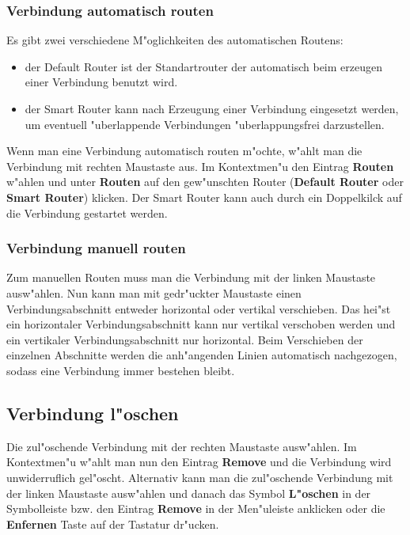 \documentclass[a4paper,titlepage,12pt,ngerman]{scrbook}
\begin{document}
\subsubsection{Verbindung automatisch routen}
Es gibt zwei verschiedene M"oglichkeiten des automatischen Routens:
\begin{itemize}
\item der Default Router ist der Standartrouter der automatisch beim erzeugen einer Verbindung benutzt wird.
\item der Smart Router kann nach Erzeugung einer Verbindung eingesetzt werden, um eventuell "uberlappende Verbindungen "uberlappungsfrei darzustellen.
\end{itemize}
Wenn man eine Verbindung automatisch routen m"ochte, w"ahlt man die Verbindung mit rechten Maustaste aus. Im Kontextmen"u den Eintrag {\bf Routen} w"ahlen und unter {\bf Routen} auf den gew"unschten Router ({\bf Default Router} oder {\bf Smart Router}) klicken.\newline
Der Smart Router kann auch durch ein Doppelkilck auf die Verbindung gestartet werden.

\subsubsection{Verbindung manuell routen}
Zum manuellen Routen muss man die Verbindung mit der linken Maustaste ausw"ahlen. Nun kann man mit gedr"uckter Maustaste einen Verbindungsabschnitt entweder horizontal oder vertikal verschieben. Das hei"st ein horizontaler Verbindungsabschnitt kann nur vertikal verschoben werden und ein vertikaler Verbindungsabschnitt nur horizontal. Beim Verschieben der einzelnen Abschnitte werden die anh"angenden Linien automatisch nachgezogen, sodass eine Verbindung immer bestehen bleibt.

\subsection{Verbindung l"oschen}
Die zul"oschende Verbindung mit der rechten Maustaste ausw"ahlen. Im Kontextmen"u w"ahlt man nun den Eintrag {\bf Remove} und die Verbindung wird unwiderruflich gel"oscht.
Alternativ kann man die zul"oschende Verbindung mit der linken Maustaste ausw"ahlen und danach das Symbol {\bf L"oschen} in der Symbolleiste bzw. den Eintrag {\bf Remove} in der Men"uleiste anklicken oder die {\bf Enfernen} Taste auf der Tastatur dr"ucken.
\end{document}
